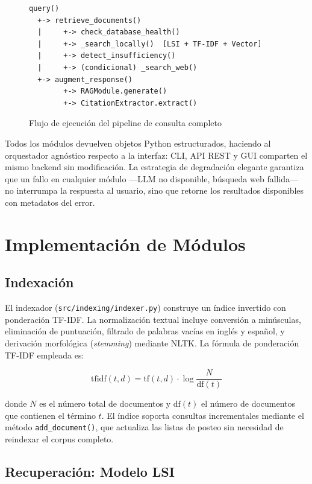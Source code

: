 \documentclass[runningheads,a4paper]{llncs}
\begin{document}
\begin{figure}[h]
\centering
\begin{verbatim}
query()
  +-> retrieve_documents()
  |     +-> check_database_health()
  |     +-> _search_locally()  [LSI + TF-IDF + Vector]
  |     +-> detect_insufficiency()
  |     +-> (condicional) _search_web()
  +-> augment_response()
        +-> RAGModule.generate()
        +-> CitationExtractor.extract()
\end{verbatim}
\caption{Flujo de ejecución del pipeline de consulta completo}
\end{figure}

Todos los módulos devuelven objetos Python estructurados, haciendo al orquestador agnóstico respecto a la interfaz: CLI, API REST y GUI comparten el mismo backend sin modificación. La estrategia de degradación elegante garantiza que un fallo en cualquier módulo —LLM no disponible, búsqueda web fallida— no interrumpa la respuesta al usuario, sino que retorne los resultados disponibles con metadatos del error.

\section{Implementación de Módulos}

\subsection{Indexación}

El indexador (\texttt{src/indexing/indexer.py}) construye un índice invertido con ponderación TF-IDF. La normalización textual incluye conversión a minúsculas, eliminación de puntuación, filtrado de palabras vacías en inglés y español, y derivación morfológica (\emph{stemming}) mediante NLTK. La fórmula de ponderación TF-IDF empleada es:

$$\text{tfidf}(t, d) = \text{tf}(t, d) \cdot \log\frac{N}{\text{df}(t)}$$

donde $N$ es el número total de documentos y $\text{df}(t)$ el número de documentos que contienen el término $t$. El índice soporta consultas incrementales mediante el método \texttt{add\_document()}, que actualiza las listas de posteo sin necesidad de reindexar el corpus completo.

\subsection{Recuperación: Modelo LSI}
\end{document}
